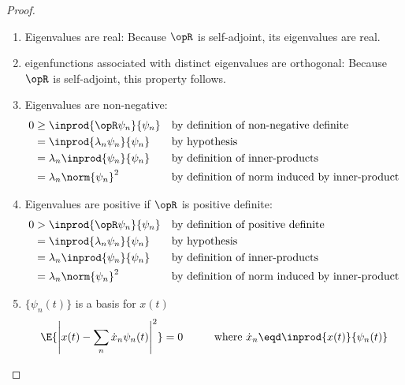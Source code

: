 \begin{proof}
\begin{enumerate}
\item Eigenvalues are real:
Because $\opR$ is self-adjoint, its eigenvalues are real.

\item eigenfunctions associated with distinct eigenvalues are orthogonal:
Because $\opR$ is self-adjoint, this property follows.

\item Eigenvalues are non-negative:
\begin{align*}
   0 &\ge \inprod{\opR \psi_n}{\psi_n}
     &&   \text{by definition of non-negative definite}
   \\&=   \inprod{\lambda_n \psi_n}{\psi_n}
     &&   \text{by hypothesis}
   \\&=   \lambda_n \inprod{\psi_n}{\psi_n}
     &&   \text{by definition of inner-products}
   \\&=   \lambda_n \norm{\psi_n}^2
     &&   \text{by definition of norm induced by inner-product}
\end{align*}

\item Eigenvalues are positive if $\opR$ is positive definite:
\begin{align*}
   0 &> \inprod{\opR \psi_n}{\psi_n}
     && \text{by definition of positive definite}
   \\&= \inprod{\lambda_n \psi_n}{\psi_n}
     && \text{by hypothesis}
   \\&= \lambda_n \inprod{\psi_n}{\psi_n}
     && \text{by definition of inner-products}
   \\&= \lambda_n \norm{\psi_n}^2
     && \text{by definition of norm induced by inner-product}
\end{align*}

\item $\{\psi_n(t)\}$ is a basis for $x(t)$
      \[ \E{\left| x(t)-\sum_n \dot{x}_n \psi_n(t) \right|^2} = 0
         \hspace{1cm}\mbox{where } \dot{x}_n\eqd \inprod{x(t)}{\psi_n(t)}
      \]


\end{enumerate}
\end{proof}

